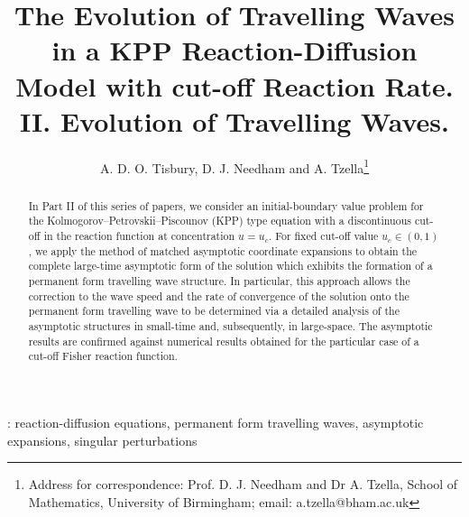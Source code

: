 \documentclass[11pt,a4paper]{article}
\begin{document}
	

\title{The Evolution of Travelling Waves in a KPP Reaction-Diffusion Model with cut-off Reaction Rate.  II. Evolution of Travelling Waves.}

 
\author{A. D. O. Tisbury, D. J. Needham and A. Tzella\thanks{Address for correspondence:   Prof. D. J. Needham and Dr A. Tzella, School of Mathematics, University of Birmingham; email:  a.tzella@bham.ac.uk}} 
\maketitle

 
 
\begin{abstract}
In Part II of this series of papers, we consider an initial-boundary value problem for the Kolmogorov--Petrovskii--Piscounov (KPP) type equation with a discontinuous cut-off in the reaction function at concentration $u=u_c$. For  fixed cut-off value $u_c \in (0,1)$, we apply the method of matched asymptotic coordinate expansions to obtain the complete   large-time asymptotic form of the solution which exhibits the formation of a permanent form travelling wave structure. In particular, this approach allows the correction to the wave speed and the rate of convergence of the solution onto the permanent form travelling wave to be determined via a detailed analysis of the asymptotic structures in small-time and, subsequently, in large-space. The asymptotic results are confirmed against numerical results obtained for the particular case of a cut-off Fisher reaction function.
\end{abstract}
: 
reaction-diffusion equations, permanent form travelling waves, asymptotic expansions, singular perturbations

 
\end{document}
